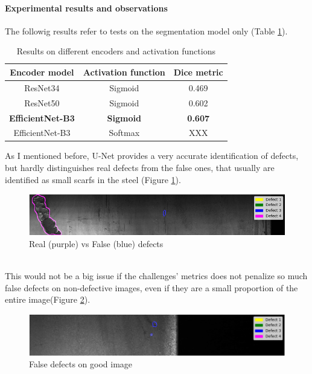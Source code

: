 \documentclass[10pt,twocolumn,letterpaper]{article}
\begin{document}
      \paragraph{Experimental results and observations}
         The followig results refer to tests on the segmentation model only (Table \ref{table:res_encoders}).
         \begin{table}[h]
            \centering
            \begin{tabular}{||c c c||} 
            \hline
            Encoder model & Activation function & Dice metric\\ [0.4ex] 
            \hline\hline
            ResNet34 & Sigmoid & 0.469 \\ 
            \hline
            ResNet50 & Sigmoid & 0.602 \\
            \hline
            \textbf{EfficientNet-B3} & \textbf{Sigmoid} & \textbf{0.607} \\
            \hline
            EfficientNet-B3 & Softmax & XXX \\
            \hline
            \end{tabular}
            \caption{Results on different encoders and activation functions}
            \label{table:res_encoders}
         \end{table}

         As I mentioned before, U-Net provides a very accurate identification of defects, but hardly distinguishes real defects from the false ones, that usually are identified as small scarfs in the steel (Figure \ref{fig:result1}). 
         \begin{figure}[h]
            \centering
            \caption{Real (purple) vs False (blue) defects} \label{fig:result1}
            \includegraphics[scale=0.5]{Img_Result1.png}
         \end{figure}
         \\This would not be a big issue if the challenges' metrics does not penalize so much false defects on non-defective images, even if they are a small proportion of the entire image(Figure \ref{fig:result2}).  
         \begin{figure}[h]
            \centering
            \caption{False defects on good image} \label{fig:result2}
            \includegraphics[scale=0.355]{Img_Result2.png}
         \end{figure}
   
\end{document}
